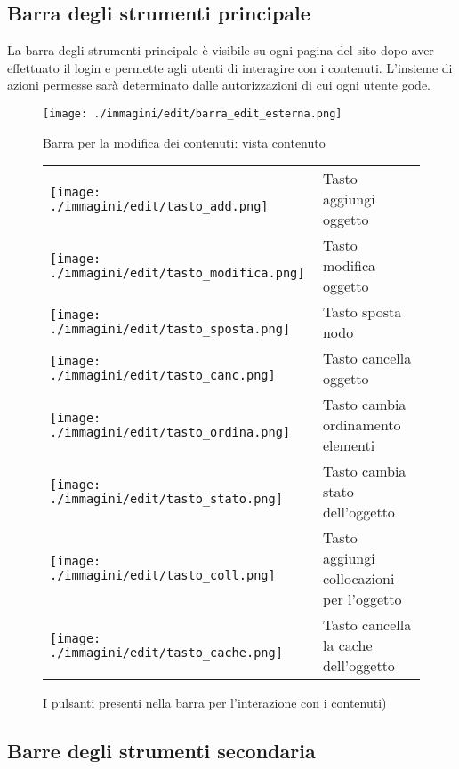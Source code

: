 \subsection{Barra degli strumenti principale}

La barra degli strumenti principale è visibile su ogni pagina del sito dopo aver effettuato il login e permette agli utenti di interagire con i contenuti. L'insieme di azioni permesse sarà determinato dalle autorizzazioni di cui ogni utente gode.

\begin{figure}[H]
 \centering
 \texttt{[image: ./immagini/edit/barra\_edit\_esterna.png]}
 \caption{Barra per la modifica dei contenuti: vista contenuto}
 \label{fig:edit_ext}
\end{figure}

\begin{figure}[H]
\begin{center}
\begin{tabular}{m{}l}
\texttt{[image: ./immagini/edit/tasto\_add.png]}& Tasto aggiungi oggetto\\
\texttt{[image: ./immagini/edit/tasto\_modifica.png]}& Tasto modifica oggetto\\
\texttt{[image: ./immagini/edit/tasto\_sposta.png]}& Tasto sposta nodo\\
\texttt{[image: ./immagini/edit/tasto\_canc.png]}& Tasto cancella oggetto\\
\texttt{[image: ./immagini/edit/tasto\_ordina.png]}& Tasto cambia ordinamento elementi\\
\texttt{[image: ./immagini/edit/tasto\_stato.png]}& Tasto cambia stato dell'oggetto\\
\texttt{[image: ./immagini/edit/tasto\_coll.png]}& Tasto aggiungi collocazioni per l'oggetto\\
\texttt{[image: ./immagini/edit/tasto\_cache.png]}& Tasto cancella la cache dell'oggetto
\end{tabular}
\caption{I pulsanti presenti nella barra per l'interazione con i contenuti)}
\end{center}
\end{figure}


\subsection{Barre degli strumenti secondaria}

